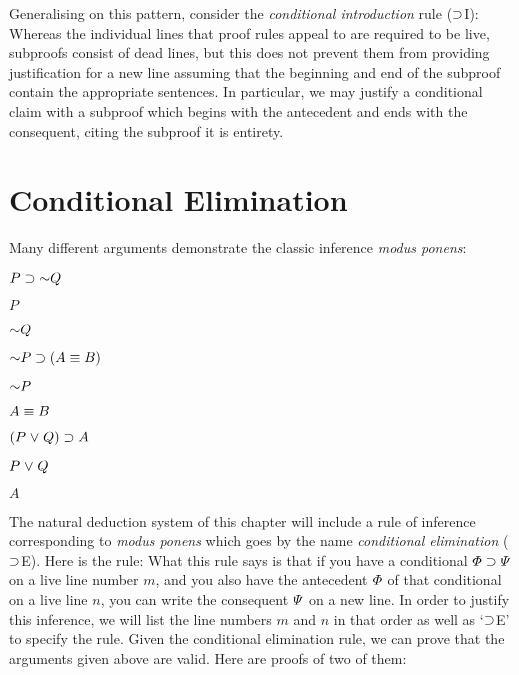 Generalising on this pattern, consider the \textit{conditional introduction} rule ($\supset$I):
Whereas the individual lines that proof rules appeal to are required to be live, subproofs consist of dead lines, but this does not prevent them from providing justification for a new line assuming that the beginning and end of the subproof contain the appropriate sentences.
In particular, we may justify a conditional claim with a subproof which begins with the antecedent and ends with the consequent, citing the subproof it is entirety.


\section{Conditional Elimination}

Many different arguments demonstrate the classic inference \emph{modus ponens}:

\begin{multicols}{3}
\begin{earg}
\item[] $P \eif \enot Q$
\item[] $P$
\item[\therefore] $\enot Q$
\end{earg}

\begin{earg}
\item[] $\enot P \eif (A \eiff B)$
\item[] $\enot P$
\item[\therefore] $A \equiv B$
\end{earg}

\begin{earg}
\item[] $(P \mkern1mu\vee\mkern1mu Q) \supset A$
\item[] $P \mkern1mu\vee\mkern1mu Q$
\item[\therefore] $A$
\end{earg}

\end{multicols}

The natural deduction system of this chapter will include a rule of inference corresponding to \emph{modus ponens} which goes by the name \textit{conditional elimination} ($\supset$E).
Here is the rule:
What this rule says is that if you have a conditional $\varPhi\supset\varPsi$ on a live line number $m$, and you also have the antecedent $\varPhi$ of that conditional on a live line $n$, you can write the consequent $\varPsi$ on a new line.
In order to justify this inference, we will list the line numbers $m$ and $n$ in that order as well as `$\supset$E' to specify the rule.
Given the conditional elimination rule, we can prove that the arguments given above are valid.
Here are proofs of two of them:


